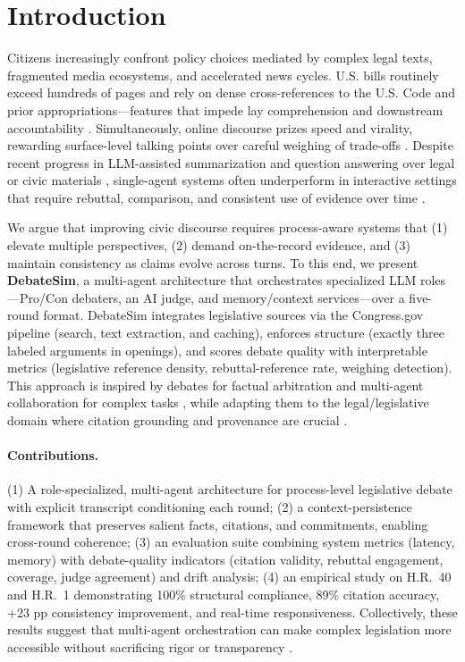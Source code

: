 \documentclass{article}
\begin{document}
\section{Introduction}

Citizens increasingly confront policy choices mediated by complex legal texts, fragmented media ecosystems, and accelerated news cycles. U.S. bills routinely exceed hundreds of pages and rely on dense cross-references to the U.S. Code and prior appropriations—features that impede lay comprehension and downstream accountability \citep{Kornilova2019BillSum,LegalBench2023}. Simultaneously, online discourse prizes speed and virality, rewarding surface-level talking points over careful weighing of trade-offs \citep{Allen2020FakeNews,Bail2020PrismBook}. Despite recent progress in LLM-assisted summarization and question answering over legal or civic materials \citep{Smith2024NLPPolicy,Johnson2023AutomatedLegis,Zhang2024CollaborativeSynthesis}, single-agent systems often underperform in interactive settings that require rebuttal, comparison, and consistent use of evidence over time \citep{Irving2018AISafetyDebate,Li2023CAMEL,Zheng2023JudgingLLMs}.

We argue that improving civic discourse requires process-aware systems that (1) elevate multiple perspectives, (2) demand on-the-record evidence, and (3) maintain consistency as claims evolve across turns. To this end, we present \textbf{DebateSim}, a multi-agent architecture that orchestrates specialized LLM roles—Pro/Con debaters, an AI judge, and memory/context services—over a five-round format. DebateSim integrates legislative sources via the Congress.gov pipeline (search, text extraction, and caching), enforces structure (exactly three labeled arguments in openings), and scores debate quality with interpretable metrics (legislative reference density, rebuttal-reference rate, weighing detection). This approach is inspired by debates for factual arbitration \citep{Irving2018AISafetyDebate,Kadavath2022KnowWhatTheyKnow} and multi-agent collaboration for complex tasks \citep{Li2023CAMEL,Park2023GenerativeAgents}, while adapting them to the legal/legislative domain where citation grounding and provenance are crucial \citep{Kornilova2019BillSum,LegalBench2023}.

\paragraph{Contributions.} 
(1) A role-specialized, multi-agent architecture for process-level legislative debate with explicit transcript conditioning each round; 
(2) a context-persistence framework that preserves salient facts, citations, and commitments, enabling cross-round coherence; 
(3) an evaluation suite combining system metrics (latency, memory) with debate-quality indicators (citation validity, rebuttal engagement, coverage, judge agreement) and drift analysis; 
(4) an empirical study on H.R.~40 and H.R.~1 demonstrating 100\% structural compliance, 89\% citation accuracy, +23 pp consistency improvement, and real-time responsiveness. Collectively, these results suggest that multi-agent orchestration can make complex legislation more accessible without sacrificing rigor or transparency \citep{Zheng2023JudgingLLMs,Bai2022ConstitutionalAI}.
\end{document}
